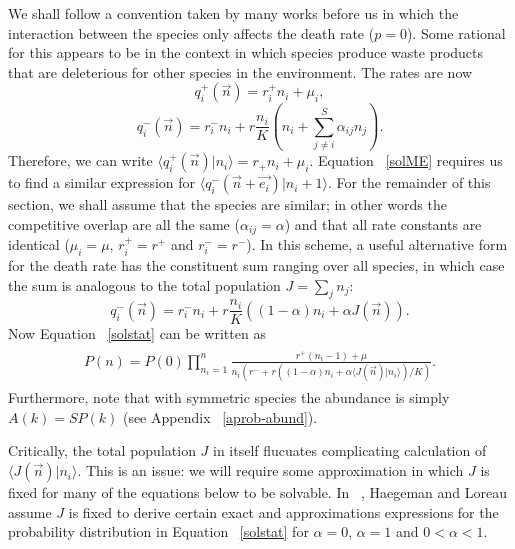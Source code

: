 \documentclass[11pt,a4paper,final]{iopart}
\begin{document}
We shall follow a convention taken by many works before us in which the interaction between the species only affects the death rate ($p=0$).
Some rational for this appears to be in the context in which species produce waste products that are deleterious for other species in the environment.
The rates are now
\begin{equation}\label{simplebirth}
q^+_i(\vec{n}) = r_i^+ n_i + \mu_i,
\end{equation}
\begin{equation*}
q^-_i(\vec{n}) = r_i^- n_i + r \frac{ n_i }{K}\left( n_i+\sum_{j\neq i}^S \alpha_{ij} n_j \right).
\end{equation*}
Therefore, we can write $\langle q^+_i(\vec{n}) | n_i \rangle = r_+ n_i + \mu_i$.
Equation ~\ref{solME} requires us to find a similar expression for $\langle q^-_i(\vec{n}+\vec{e_i}) | n_i +1 \rangle$.
For the remainder of this section, we shall assume that the species are similar; in other words the competitive overlap are all the same ($\alpha_{ij}=\alpha$) and that all rate constants are identical ($\mu_i=\mu$, $r_i^+=r^+$ and $r_i^-=r^-$).
In this scheme, a useful alternative form for the death rate has the constituent sum ranging over all species, in which case the sum is analogous to the total population $J=\sum_j n_j$:
\begin{equation}\label{simpledeath}
q^-_i(\vec{n}) = r_i^- n_i +  r \frac{ n_i }{K}\left( (1-\alpha)n_i+ \alpha J(\vec{n}) \right).
\end{equation}
Now Equation ~\ref{solstat} can be written as
\begin{align}\label{alphasol}
\begin{split}
P(n) = P(0)\prod_{n_i=1}^n \frac{r^+ (n_i-1) + \mu}{n_i\left( r^- + r \left( (1-\alpha)n_i + \alpha \langle J(\vec{n}) |n_i \rangle \right)/K \right)}.
\end{split}
\end{align}
Furthermore, note that with symmetric species the abundance is simply $A(k)=SP(k)$ (see Appendix ~\ref{aprob-abund}).

Critically, the total population $J$ in itself flucuates complicating calculation of $\langle J(\vec{n}) |n_i \rangle$.
This is an issue: we will require some approximation in which $J$ is fixed for many of the equations below to be solvable.
In ~\cite{ref7}, Haegeman and Loreau assume $J$ is fixed to derive certain exact and approximations expressions for the probability distribution in Equation ~\ref{solstat} for $\alpha=0$, $\alpha=1$ and $0 < \alpha < 1$.
\end{document}

